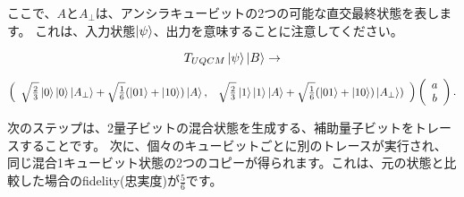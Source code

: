 ここで、$A$と$A_\bot$は、アンシラキュービットの2つの可能な直交最終状態を表します。 これは、入力状態$\ket{\psi}$、出力を意味することに注意してください。

\begin{equation}
\label{267}
T_{UQCM} \ket{\psi} \ket{B} 
\to 
\end{equation}

\begin{equation}
\label{268}
\left( \begin{array}{cc}
\sqrt{\frac{2}{3}} \ket{0} \ket{0} \ket{A_\bot}
+
\sqrt{\frac{1}{6}} ( \ket{01} + \ket{10} )\ket{A},
&
\sqrt{\frac{2}{3}} \ket{1} \ket{1} \ket{A}
+
\sqrt{\frac{1}{6}} ( \ket{01} + \ket{10} )\ket{A_\bot} )
\end{array} \right)
\left( \begin{array}{cc}
a \\
b
\end{array} \right).
\end{equation}

次のステップは、2量子ビットの混合状態を生成する、補助量子ビットをトレースすることです。
次に、個々のキュービットごとに別のトレースが実行され、同じ混合1キュービット状態の2つのコピーが得られます。これは、元の状態と比較した場合のfidelity(忠実度)が$\frac{5}{6}$です。





